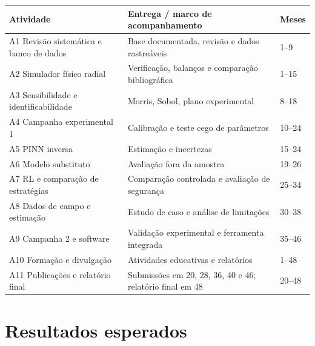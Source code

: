 \documentclass[10pt,a4paper]{article}
\newcommand{\itemedital}[1]{}
\begin{document}
\begin{center}\small
\begin{tabularx}{\textwidth}{@{}lXl@{}}
\toprule Atividade & Entrega / marco de acompanhamento & Meses \\
\midrule
A1 Revisão sistemática e banco de dados & Base documentada, revisão e dados rastreáveis & 1--9 \\
A2 Simulador físico radial & Verificação, balanços e comparação bibliográfica & 1--15 \\
A3 Sensibilidade e identificabilidade & Morris, Sobol, plano experimental & 8--18 \\
A4 Campanha experimental 1 & Calibração e teste cego de parâmetros & 10--24 \\
A5 PINN inversa & Estimação e incertezas & 15--24 \\
A6 Modelo substituto & Avaliação fora da amostra & 19--26 \\
A7 RL e comparação de estratégias & Comparação controlada e avaliação de segurança & 25--34 \\
A8 Dados de campo e estimação & Estudo de caso e análise de limitações & 30--38 \\
A9 Campanha 2 e software & Validação experimental e ferramenta integrada & 35--46 \\
A10 Formação e divulgação & Atividades educativas e relatórios & 1--48 \\
A11 Publicações e relatório final & Submissões em 20, 28, 36, 40 e 46; relatório final em 48 & 20--48 \\
\bottomrule
\end{tabularx}
\end{center}
\section{Resultados esperados}\label{sec:resultados}\itemedital{2.16 XV}
\end{document}
